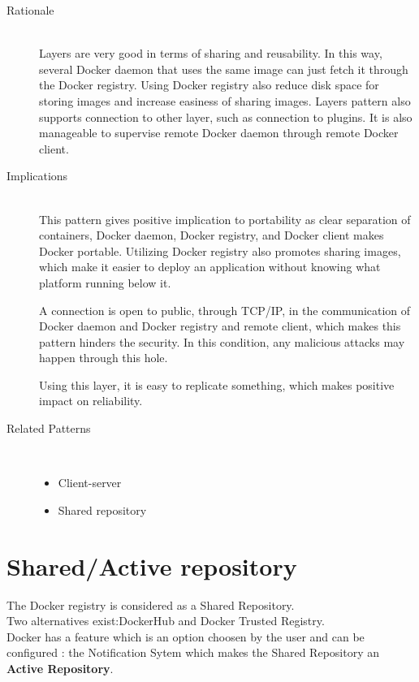 \begin{description}
\item [Rationale] ~\\
Layers are very good in terms of sharing and reusability. In this way, several
Docker daemon that uses the same image can just fetch it through the Docker
registry. Using Docker registry also reduce disk space for storing images and
increase easiness of sharing images. Layers pattern also supports connection to
other layer, such as connection to plugins. It is also manageable to supervise
remote Docker daemon through remote Docker client.

\item [Implications]~\\
This pattern gives positive implication to portability as clear separation of
containers, Docker daemon, Docker registry, and Docker client makes Docker
portable. Utilizing Docker registry also promotes sharing images, which make it
easier to deploy an application without knowing what platform running below it.

A connection is open to public, through TCP/IP, in the communication of Docker
daemon and Docker registry and remote client, which makes this pattern hinders
the security. In this condition, any malicious attacks may happen through this
hole.

Using this layer, it is easy to replicate something, which makes positive impact
on reliability.

\item [Related Patterns]~
\begin{itemize}
	\item Client-server
	\item Shared repository
\end{itemize}
\end{description}



\section{Shared/Active repository}

The Docker registry is considered as a Shared Repository. \\
Two alternatives exist:DockerHub and Docker Trusted Registry. \\
Docker has a feature which is an option choosen by the user and can be configured : the Notification Sytem \cite{docknotif} which makes the Shared Repository an \textbf{Active Repository}.


